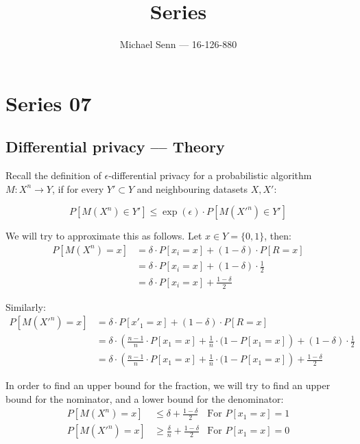\documentclass[a4paper]{scrreprt}
\title{Series \series}
\author{Michael Senn \maillink{michael.senn@students.unibe.ch} --- 16-126-880}
\date{\printdate}
\newcommand{\series}{07}
\begin{document}
\maketitle


\setcounter{chapter}{\numexpr \series - 1 \relax}

\chapter{Series \series}

\section{Differential privacy --– Theory}

Recall the definition of $\epsilon$-differential privacy for a probabilistic
algorithm $M: X^n \rightarrow Y$, if for every $Y' \subset Y$ and neighbouring
datasets $X, X'$:

\[
  P[M(X^n) \in Y'] \leq \exp(\epsilon) \cdot P[M(X'^n) \in Y']
\]

We will try to approximate this as follows. Let $x \in Y = \{0, 1\}$, then:
\begin{align*}
  P[M(X^n) = x] & = \delta \cdot P[x_i = x] + (1 - \delta) \cdot P[R = x] \\
                & = \delta \cdot P[x_i = x] + (1 - \delta) \cdot \frac{1}{2} \\
                & = \delta \cdot P[x_i = x] + \frac{1 - \delta}{2}
\end{align*}

Similarly:
\begin{align*}
  P[M(X'^n) = x] & = \delta \cdot P[x'_1 = x] + (1 - \delta) \cdot P[R = x] \\
                 & = \delta \cdot \left(\frac{n-1}{n} \cdot P[x_1 = x] + \frac{1}{n} \cdot (1 - P[x_1 = x]\right) + (1 - \delta) \cdot \frac{1}{2} \\
                 & = \delta \cdot \left(\frac{n-1}{n} \cdot P[x_1 = x] + \frac{1}{n} \cdot (1 - P[x_1 = x]\right) + \frac{1 - \delta}{2}
\end{align*}

In order to find an upper bound for the fraction, we will try to find an upper
bound for the nominator, and a lower bound for the denominator:
\begin{align*}
  P[M(X^n) = x] & \leq \delta + \frac{1 - \delta}{2} & \text{For } P[x_1 = x] = 1 \\
  P[M(X'^n) = x] & \geq \frac{\delta}{n} + \frac{1 - \delta}{2} & \text{For } P[x_1 = x] = 0
\end{align*}
\end{document}
